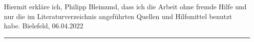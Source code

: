 Hiermit erkläre ich, Philipp Bleimund, dass ich die Arbeit ohne fremde Hilfe und nur die im Literaturverzeichnis angeführten Quellen und Hilfsmittel benutzt habe.
\bigskip
\newline
Bielefeld, 06.04.2022\noindent\hfill\rule{5cm}{.4pt}\par
